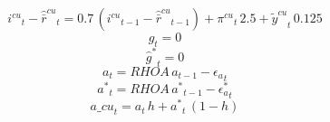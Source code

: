 \begin{dmath}
{{i^{cu}}}_{t}-{{\hat {\bar r}^{cu}}}_{t}=0.7\, \left({{i^{cu}}}_{t-1}-{{\hat {\bar r}^{cu}}}_{t-1}\right)+{{\pi^{cu}}}_{t}\, 2.5+{{\tilde y^{cu}}}_{t}\, 0.125
\end{dmath}
\begin{dmath}
{{\hat g}}_{t}=0
\end{dmath}
\begin{dmath}
{{\hat g^*}}_{t}=0
\end{dmath}
\begin{dmath}
{{a}}_{t}={RHOA}\, {{a}}_{t-1}-{{\epsilon_a}}_{t}
\end{dmath}
\begin{dmath}
{{a^*}}_{t}={RHOA}\, {{a^*}}_{t-1}-{{\epsilon_a^*}}_{t}
\end{dmath}
\begin{dmath}
{a\_cu}_{t}={{a}}_{t}\, {{h}}+{{a^*}}_{t}\, \left(1-{{h}}\right)
\end{dmath}
